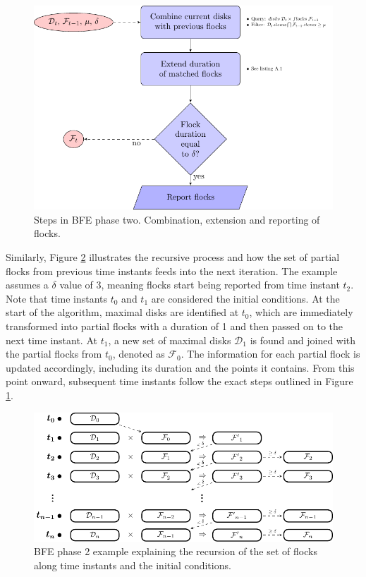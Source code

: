 \begin{figure}
    \centering
    \includegraphics[width=0.85\linewidth]{chapter4/figures/FF_flowchart}
    \caption{Steps in BFE phase two. Combination, extension and reporting of flocks.}\label{fig:FF_flowchart}
\end{figure}

Similarly, Figure \ref{fig:FF_stages} illustrates the recursive process and how the set of partial flocks from previous time instants feeds into the next iteration. The example assumes a $\delta$ value of 3, meaning flocks start being reported from time instant $t_2$. Note that time instants $t_0$ and $t_1$ are considered the initial conditions. At the start of the algorithm, maximal disks are identified at $t_0$, which are immediately transformed into partial flocks with a duration of 1 and then passed on to the next time instant. At $t_1$, a new set of maximal disks $\mathcal{D}_1$ is found and joined with the partial flocks from $t_0$, denoted as $\mathcal{F}_0$. The information for each partial flock is updated accordingly, including its duration and the points it contains. From this point onward, subsequent time instants follow the exact steps outlined in Figure \ref{fig:FF_flowchart}.

\begin{figure}
    \centering
    \includegraphics[width=\linewidth]{chapter4/figures/FF_stages}
    \caption{BFE phase 2 example explaining the recursion of the set of flocks along time instants and the initial conditions.}\label{fig:FF_stages}
\end{figure}

